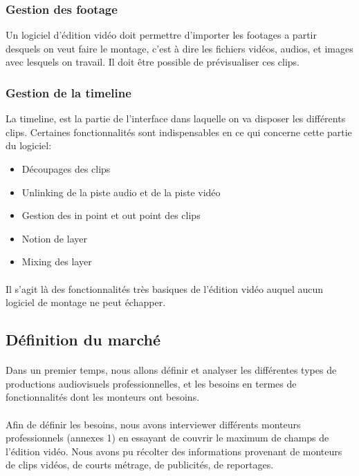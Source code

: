     \subsubsection{Gestion des footage}
      Un logiciel d'édition vidéo doit permettre d'importer les footages a partir
      desquels on veut faire le montage, c'est à dire les fichiers vidéos, audios,
      et images avec lesquels on travail. Il doit être possible de prévisualiser ces
      clips.

    \subsubsection{Gestion de la timeline}
      La timeline, est la partie de l'interface dans laquelle on va disposer les
      différents clips. Certaines fonctionnalités sont indispensables en ce qui
      concerne cette partie du logiciel:
        \begin{itemize}
          \item{Découpages des clips}
          \item{Unlinking de la piste audio et de la piste vidéo}
          \item{Gestion des in point et  out point des clips} %
          \item{Notion de layer}
          \item{Mixing des layer}
        \end{itemize}

      \paragraph{}
        Il s'agit là des fonctionnalités très basiques de l'édition vidéo auquel
        aucun logiciel de montage ne peut échapper.

  \subsection{Définition du marché}
    \paragraph{}
    Dans un premier temps, nous allons définir et analyser les différentes types
    de productions audiovisuels professionnelles, et les besoins en termes de
    fonctionnalités dont les monteurs ont besoins.


    \paragraph{}
    Afin de définir les besoins, nous avons interviewer différents
    monteurs professionnels (annexes 1) en essayant de couvrir le %
    maximum de champs de l'édition vidéo. Nous avons pu récolter des
    informations provenant de monteurs de clips vidéos, de courts métrage,
    de publicités, de reportages. %

